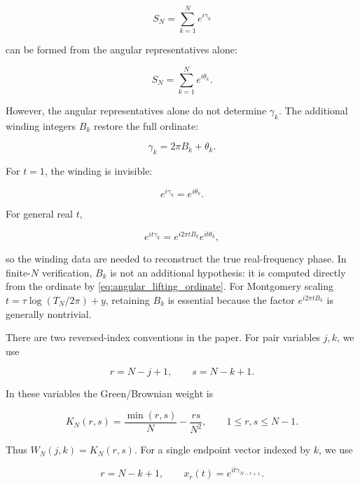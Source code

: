 \documentclass[11pt]{amsart}
\numberwithin{equation}{section}
\theoremstyle{plain}
\theoremstyle{definition}
\theoremstyle{remark}
\begin{document}
\begin{equation}
S_N=\sum_{k=1}^{N}e^{i\gamma_k}
\end{equation}

can be formed from the angular representatives alone:

\begin{equation}
S_N=\sum_{k=1}^{N}e^{i\theta_k}.
\end{equation}

However, the angular representatives alone do not determine
\(\gamma_k\). The additional winding integers \(B_k\) restore the full
ordinate:

\begin{equation}
\gamma_k=2\pi B_k+\theta_k.
\end{equation}

For \(t=1\), the winding is invisible:

\begin{equation}
e^{i\gamma_k}=e^{i\theta_k}.
\end{equation}

For general real \(t\),

\begin{equation}
e^{it\gamma_k}
=
e^{i2\pi tB_k}e^{it\theta_k},
\end{equation}

so the winding data are needed to reconstruct the true real-frequency
phase. In finite-\(N\) verification, \(B_k\) is not
an additional hypothesis: it is computed directly from the ordinate by
\eqref{eq:angular_lifting_ordinate}. For Montgomery scaling
\(t=\tau\log(T_N/2\pi)+y\), retaining \(B_k\) is essential because the factor
\(e^{i2\pi tB_k}\) is generally nontrivial.

There are two reversed-index conventions in the paper. For pair
variables \(j,k\), we use

\begin{equation}
r=N-j+1,
\qquad
s=N-k+1.
\label{eq:green_kernel_reversed_indices}
\end{equation}

In these variables the Green/Brownian weight is

\begin{equation}
K_N(r,s)
=
\frac{\min(r,s)}{N}
-
\frac{rs}{N^2},
\qquad
1\le r,s\le N-1.
\label{eq:KN_green_kernel_definition}
\end{equation}

Thus \(W_N(j,k)=K_N(r,s)\). For a single endpoint vector indexed by
\(k\), we use

\begin{equation}
r=N-k+1,
\qquad
x_r(t)=e^{it\gamma_{N-r+1}}.
\end{equation}
\end{document}
